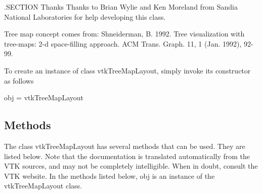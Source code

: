 .S\-E\-C\-T\-I\-O\-N Thanks Thanks to Brian Wylie and Ken Moreland from Sandia National Laboratories for help developing this class.

Tree map concept comes from\-: Shneiderman, B. 1992. Tree visualization with tree-\/maps\-: 2-\/d space-\/filling approach. A\-C\-M Trans. Graph. 11, 1 (Jan. 1992), 92-\/99.

To create an instance of class vtk\-Tree\-Map\-Layout, simply invoke its constructor as follows \begin{DoxyVerb}  obj = vtkTreeMapLayout
\end{DoxyVerb}
 \hypertarget{vtkwidgets_vtkxyplotwidget_Methods}{}\subsection{Methods}\label{vtkwidgets_vtkxyplotwidget_Methods}
The class vtk\-Tree\-Map\-Layout has several methods that can be used. They are listed below. Note that the documentation is translated automatically from the V\-T\-K sources, and may not be completely intelligible. When in doubt, consult the V\-T\-K website. In the methods listed below, {\ttfamily obj} is an instance of the vtk\-Tree\-Map\-Layout class. 
